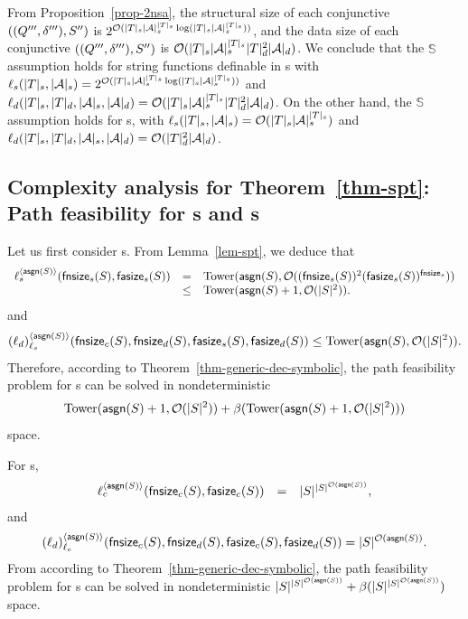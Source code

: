 From Proposition~\ref{prop-2nsa}, 
the structural size of each conjunctive \SA{} $((Q''',\delta'''), S'')$ is 
$ 2^{\mathcal{O}( |T|_s |\mathcal{A}|_s^{|T|_s} \log (|T|_s |\mathcal{A}|_s^{|T|_s}))}$, 
and the data size of  each conjunctive \SA{} $((Q''',\delta'''), S'')$ is 
$ \mathcal{O}( |T|_s |\mathcal{A}|_s^{|T|_s} |T|^2_d |\mathcal{A}|_d )$. 
We conclude that 
the $\mathbb{S}$\prerec{} assumption holds for string functions definable in \SSPT{}s with $\ell_s(|T|_s, |\mathcal{A}|_s) = 2^{\mathcal{O}( |T|_s |\mathcal{A}|_s^{|T|_s} \log (|T|_s |\mathcal{A}|_s^{|T|_s}))}$ and $\ell_d(|T|_s, |T|_d, |\mathcal{A}|_s, |\mathcal{A}|_d) = \mathcal{O}(|T|_s |\mathcal{A}|_s^{|T|_s} |T|^2_d |\mathcal{A}|_d)$.
On the other hand, the $\mathbb{S}$\prerec{} assumption holds for \SPT{}s, with $\ell_s(|T|_s, |\mathcal{A}|_s) = \mathcal{O}(|T|_s |\mathcal{A}|_s^{|T|_s})$ and  $\ell_d(|T|_s, |T|_d, |\mathcal{A}|_s, |\mathcal{A}|_d) = \mathcal{O}(|T|^2_d |\mathcal{A}|_d)$.


\subsection{Complexity analysis for Theorem~\ref{thm-spt}: Path feasibility for \SSPT{}s and \SPT{}s}

Let us first consider \SSPT{}s. From Lemma~\ref{lem-spt}, we deduce that 
$$
\begin{array}{l c l}
\ell_s^{\langle \mathsf{asgn}(S) \rangle}(\mathsf{fnsize}_s(S), \mathsf{fasize}_s(S)) &=& \mathrm{Tower}(\mathsf{asgn}(S), \mathcal{O}((\mathsf{fnsize}_s(S))^2 (\mathsf{fasize}_s(S))^{\mathsf{fnsize}_s})) \\
& \le &  \mathrm{Tower}(\mathsf{asgn}(S)+1, \mathcal{O}(|S|^2)).
\end{array}
$$
and
$$
(\ell_d)^{\langle \mathsf{asgn}(S) \rangle}_{\ell_s}(\mathsf{fnsize}_c(S), \mathsf{fnsize}_d(S), \mathsf{fasize}_s(S), \mathsf{fasize}_d(S)) \\
\le  \mathrm{Tower}(\mathsf{asgn}(S), \mathcal{O}(|S|^2)).
$$
Therefore, according to Theorem~\ref{thm-generic-dec-symbolic},  the path feasibility problem for \SSPT{}s can be solved in nondeterministic 
$$\mathrm{Tower}(\mathsf{asgn}(S)+1, \mathcal{O}(|S|^2)) + \beta(\mathrm{Tower}(\mathsf{asgn}(S)+1, \mathcal{O}(|S|^2)))$$
 space.
 
 For \SPT{}s, 
 $$
\begin{array}{l c l}
\ell_c^{\langle \mathsf{asgn}(S) \rangle}(\mathsf{fnsize}_c(S), \mathsf{fasize}_c(S)) &=& |S|^{|S|^{\mathcal{O}(\mathsf{asgn}(S))}},
\end{array}
$$
and
$$
(\ell_d)^{\langle \mathsf{asgn}(S) \rangle}_{\ell_c}(\mathsf{fnsize}_c(S), \mathsf{fnsize}_d(S), \mathsf{fasize}_c(S), \mathsf{fasize}_d(S)) = |S|^{\mathcal{O}(\mathsf{asgn}(S))}.
$$
From according to Theorem~\ref{thm-generic-dec-symbolic}, the path feasibility problem for \SPT{}s can be solved in nondeterministic 
$|S|^{|S|^{\mathcal{O}(\mathsf{asgn}(S))}} + \beta(|S|^{|S|^{\mathcal{O}(\mathsf{asgn}(S))}})$
space.
